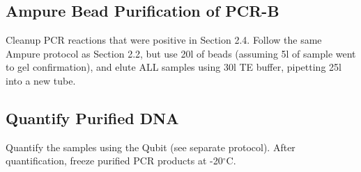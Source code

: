 \documentclass[letterpaper]{article}
\begin{document}
\subsection{Ampure Bead Purification of PCR-B}

Cleanup PCR reactions that were positive in Section 2.4. Follow the same Ampure protocol as Section 2.2, but use 20\unit{}{\micro}l of beads (assuming 5\unit{}{\micro}l of sample went to gel confirmation), and elute ALL samples using 30\unit{}{\micro}l TE buffer, pipetting 25\unit{}{\micro}l into a new tube.

\subsection{Quantify Purified DNA}
Quantify the samples using the Qubit (see separate protocol). After quantification, freeze purified PCR products at -20$^{\circ}$C.
\end{document}
